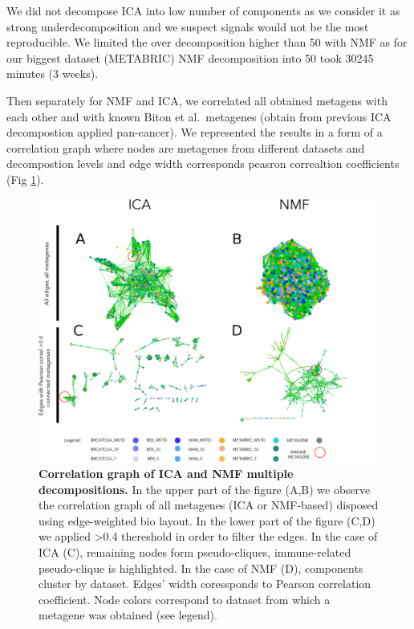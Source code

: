 \documentclass[12pt,]{book}
\theoremstyle{definition}
\theoremstyle{definition}
\theoremstyle{definition}
\theoremstyle{remark}
\begin{document}
We did not decompose ICA into low number of components as we consider it
as strong underdecomposition and we suspect signals would not be the
most reproducible. We limited the over decomposition higher than 50 with
NMF as for our biggest dataset (METABRIC) NMF decomposition into 50 took
30245 minutes (3 weeks).

Then separately for NMF and ICA, we correlated all obtained metagens
with each other and with known Biton et al.~metagenes (obtain from
previous ICA decompostion applied pan-cancer). We represented the
results in a form of a correlation graph where nodes are metagenes from
different datasets and decompostion levels and edge width corresponds
peasron correaltion coefficients (Fig \ref{fig:ICAvsNMF}).

\begin{figure}

{\centering \includegraphics[width=1\linewidth]{figures-ext/ICANMF} 

}

\caption{\textbf{Correlation graph of ICA and NMF multiple
decompositions.} In the upper part of the figure (A,B) we observe the
correlation graph of all metagenes (ICA or NMF-based) disposed using
edge-weighted bio layout. In the lower part of the figure (C,D) we
applied \textgreater{}0.4 thereshold in order to filter the edges. In
the case of ICA (C), remaining nodes form pseudo-cliques, immune-related
pseudo-clique is highlighted. In the case of NMF (D), components cluster
by dataset. Edges' width coressponds to Pearson correlation coefficient.
Node colors correspond to dataset from which a metagene was obtained
(see legend).}\label{fig:ICAvsNMF}
\end{figure}
\end{document}

